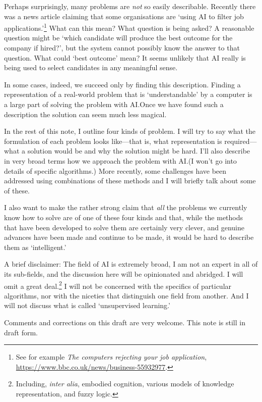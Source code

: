\documentclass[10pt, a4paper, twocolumn]{article}
\begin{document}
Perhaps surprisingly, many problems are \emph{not} so easily
describable. Recently there was a news article claiming that some organisations
are `using AI to filter job applications.'\footnote{See for example \emph{The
computers rejecting your job application},
\url{https://www.bbc.co.uk/news/business-55932977}.} What can this mean? What
question is being asked? A reasonable question might be `which candidate will
produce the best outcome for the company if hired?', but the system cannot
possibly know the answer to that question. What could `best outcome' mean? It
seems unlikely that AI really is being used to select candidates in any
meaningful sense.

In some cases, indeed, we succeed only by finding this description. Finding a
representation of a real-world problem that is `understandable' by a computer is
a large part of solving the problem with AI.\@ Once we have found such a
description the solution can seem much less magical.

In the rest of this note, I outline four kinds of problem. I will try to say
what the formulation of each problem looks like---that is, what representation is
required---what a solution would be and why the solution might be hard. I'll also
describe in very broad terms how we approach the problem with AI.\@ (I won't go
into details of specific algorithms.) More recently, some challenges have been
addressed using combinations of these methods and I will briefly talk about some
of these.

I also want to make the rather strong claim that \emph{all} the problems we
currently know how to solve are of one of these four kinds and that, while the
methods that have been developed to solve them are certainly very clever, and
genuine advances have been made and continue to be made, it would be hard to
describe them as `intelligent.'

A brief disclaimer: The field of AI is extremely broad, I am not an expert in all
of its sub-fields, and the discussion here will be opinionated and abridged. I
will omit a great deal.\footnote{Including, \emph{inter alia}, embodied cognition, various
models of knowledge representation, and fuzzy logic.} I will not be concerned
with the specifics of particular algorithms, nor with the niceties that
distinguish one field from another. And I will not discuss what is called
`unsupervised learning.'

Comments and corrections on this draft are very welcome. This note is still in
draft form.
\end{document}
